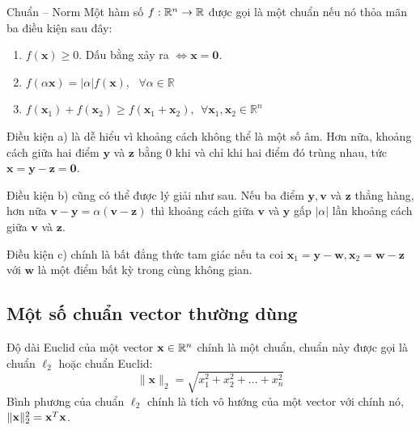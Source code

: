 \begin{mydef}{Chuẩn -- Norm}
Một hàm số $f: \mathbb{R}^n \rightarrow \mathbb{R}$ được gọi là một chuẩn nếu nó thỏa mãn ba
điều kiện sau đây:
\begin{enumerate}

\item $f(\mathbf{x}) \geq 0$. Dấu bằng xảy ra $\Leftrightarrow \mathbf{x = 0} $.

\item $f(\alpha \mathbf{x}) = |\alpha| f(\mathbf{x}), ~~~\forall \alpha \in \mathbb{R}\ $

\item $f(\mathbf{x}_1) + f(\mathbf{x}_2) \geq f(\mathbf{x}_1 + \mathbf{x}_2),
~~\forall \mathbf{x}_1, \mathbf{x}_2 \in \mathbb{R}^n$

\end{enumerate}\end{mydef}

{Điều kiện a)} là dễ hiểu vì khoảng cách không thể là một số âm.
Hơn nữa, khoảng cách giữa hai điểm $\mathbf{y}$ và $\mathbf{z}$ bằng 0 khi và
chỉ khi hai điểm đó trùng nhau, tức $\mathbf{x = y - z = 0} $.

{Điều kiện b)} cũng có thể được lý giải như sau. Nếu ba điểm
$\mathbf{y, v}$ và $\mathbf{z}$ thẳng hàng, hơn nữa
$\mathbf{v - y} = \alpha (\mathbf{v - z}) $ thì khoảng cách giữa $\mathbf{v}$ và
$\mathbf{y}$ gấp $ |\alpha |$ lần khoảng cách giữa $\mathbf{v}$ và
$\mathbf{z}$.

{Điều kiện c)} chính là bất đẳng thức tam giác nếu ta coi
$\mathbf{x}_1 = \mathbf{y - w}, \mathbf{x}_2 = \mathbf{w - z} $ với
$\mathbf{w}$ là một điểm bất kỳ trong cùng không gian.



\subsection{Một số chuẩn vector thường dùng}
\label{sub:norms}


Độ dài Euclid của một vector $\mathbf{x} \in \mathbb{R}^n$ chính là một chuẩn, chuẩn này
được gọi là chuẩn $\ell_2$ hoặc chuẩn Euclid:
\begin{equation}
\label{eqn:norm2}
\|\mathbf{x}\|_2 = \sqrt{x_1^2 + x_2^2 + \dots + x_n^2}
\end{equation}
Bình phương của chuẩn $\ell_2$ chính là tích vô hướng của một vector với chính nó,
$\|\mathbf{x}\|_2^2 = \mathbf{x}^T\mathbf{x}$.

